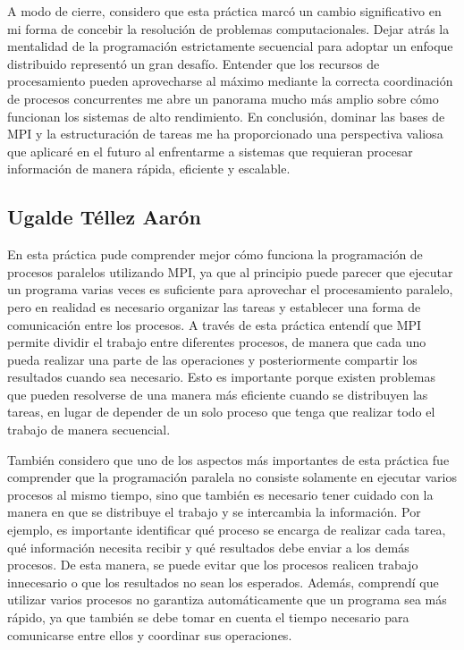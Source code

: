 A modo de cierre, considero que esta práctica marcó un cambio significativo en mi forma de concebir la resolución de problemas computacionales. Dejar atrás la mentalidad de la programación estrictamente secuencial para adoptar un enfoque distribuido representó un gran desafío. Entender que los recursos de procesamiento pueden aprovecharse al máximo mediante la correcta coordinación de procesos concurrentes me abre un panorama mucho más amplio sobre cómo funcionan los sistemas de alto rendimiento. En conclusión, dominar las bases de MPI y la estructuración de tareas me ha proporcionado una perspectiva valiosa que aplicaré en el futuro al enfrentarme a sistemas que requieran procesar información de manera rápida, eficiente y escalable.
\clearpage
\subsection{Ugalde Téllez Aarón}
En esta práctica pude comprender mejor cómo funciona la programación de procesos paralelos utilizando MPI, ya que al principio puede parecer que ejecutar un programa varias veces es suficiente para aprovechar el procesamiento paralelo, pero en realidad es necesario organizar las tareas y establecer una forma de comunicación entre los procesos. A través de esta práctica entendí que MPI permite dividir el trabajo entre diferentes procesos, de manera que cada uno pueda realizar una parte de las operaciones y posteriormente compartir los resultados cuando sea necesario. Esto es importante porque existen problemas que pueden resolverse de una manera más eficiente cuando se distribuyen las tareas, en lugar de depender de un solo proceso que tenga que realizar todo el trabajo de manera secuencial.

También considero que uno de los aspectos más importantes de esta práctica fue comprender que la programación paralela no consiste solamente en ejecutar varios procesos al mismo tiempo, sino que también es necesario tener cuidado con la manera en que se distribuye el trabajo y se intercambia la información. Por ejemplo, es importante identificar qué proceso se encarga de realizar cada tarea, qué información necesita recibir y qué resultados debe enviar a los demás procesos. De esta manera, se puede evitar que los procesos realicen trabajo innecesario o que los resultados no sean los esperados. Además, comprendí que utilizar varios procesos no garantiza automáticamente que un programa sea más rápido, ya que también se debe tomar en cuenta el tiempo necesario para comunicarse entre ellos y coordinar sus operaciones.

